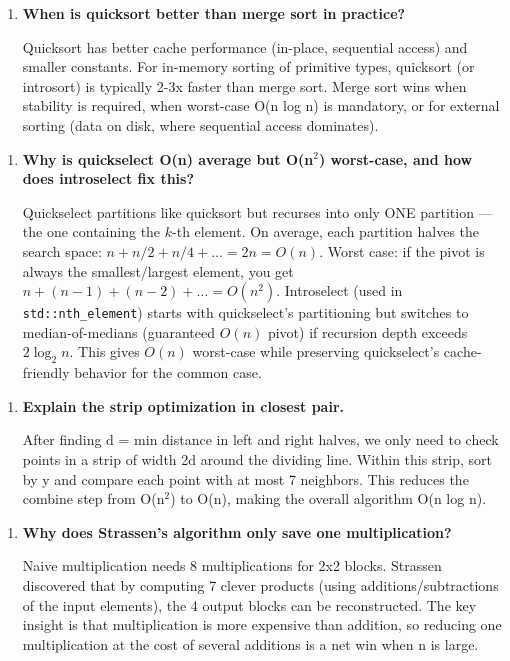 \begin{enumerate}
\item \textbf{When is quicksort better than merge sort in practice?}

Quicksort has better cache performance (in-place, sequential access) and smaller constants. For in-memory sorting of primitive types, quicksort (or introsort) is typically 2-3x faster than merge sort. Merge sort wins when stability is required, when worst-case O(n log n) is mandatory, or for external sorting (data on disk, where sequential access dominates).
\end{enumerate}

\begin{enumerate}
\item \textbf{Why is quickselect O(n) average but O(n$^{2}$) worst-case, and how does introselect fix this?}

Quickselect partitions like quicksort but recurses into only ONE partition --- the one containing the $k$-th element. On average, each partition halves the search space: $n + n/2 + n/4 + \ldots = 2n = O(n)$. Worst case: if the pivot is always the smallest/largest element, you get $n + (n-1) + (n-2) + \ldots = O(n^{2})$. Introselect (used in \texttt{std::nth\_element}) starts with quickselect's partitioning but switches to median-of-medians (guaranteed $O(n)$ pivot) if recursion depth exceeds $2 \log_{2} n$. This gives $O(n)$ worst-case while preserving quickselect's cache-friendly behavior for the common case.
\end{enumerate}

\begin{enumerate}
\item \textbf{Explain the strip optimization in closest pair.}

After finding d = min distance in left and right halves, we only need to check points in a strip of width 2d around the dividing line. Within this strip, sort by y and compare each point with at most 7 neighbors. This reduces the combine step from O(n$^{2}$) to O(n), making the overall algorithm O(n log n).
\end{enumerate}

\begin{enumerate}
\item \textbf{Why does Strassen's algorithm only save one multiplication?}

Naive multiplication needs 8 multiplications for 2x2 blocks. Strassen discovered that by computing 7 clever products (using additions/subtractions of the input elements), the 4 output blocks can be reconstructed. The key insight is that multiplication is more expensive than addition, so reducing one multiplication at the cost of several additions is a net win when n is large.
\end{enumerate}

